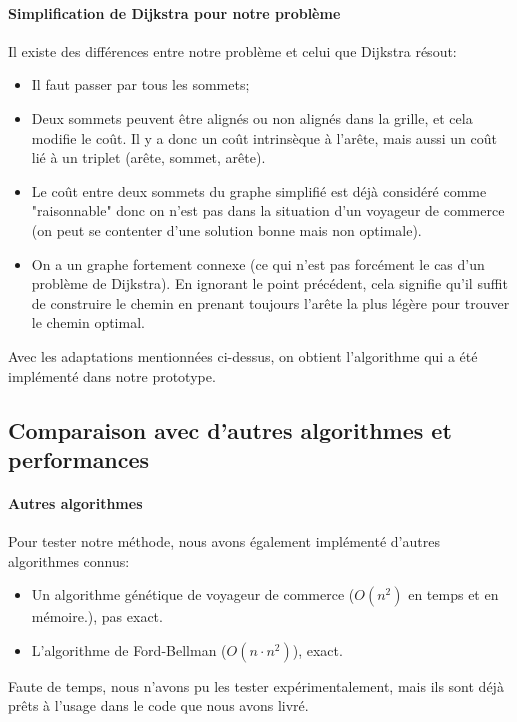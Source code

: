 \paragraph{Simplification de Dijkstra pour notre problème}
Il existe des différences entre notre problème et celui que Dijkstra résout:
\begin{itemize}
	\item Il faut passer par tous les sommets;
	\item Deux sommets peuvent être alignés ou non alignés dans la grille, et cela modifie le coût. Il y a donc un coût intrinsèque à l'arête, mais aussi un coût lié à un triplet (arête, sommet, arête).
	\item Le coût entre deux sommets du graphe simplifié est déjà considéré comme "raisonnable" donc on n'est pas dans la situation d'un voyageur de commerce (on peut se contenter d'une solution bonne mais non optimale). \cite{wiki:voyageurCommerce}
	\item On a un graphe fortement connexe (ce qui n'est pas forcément le cas d'un problème de Dijkstra). En ignorant le point précédent, cela signifie qu'il suffit de construire le chemin en prenant toujours l'arête la plus légère pour trouver le chemin optimal.
\end{itemize}
Avec les adaptations mentionnées ci-dessus, on obtient l'algorithme qui a été implémenté dans notre prototype.
\subsection{Comparaison avec d'autres algorithmes et performances}
\paragraph{Autres algorithmes}
Pour tester notre méthode, nous avons également implémenté d'autres algorithmes connus:
\begin{itemize}
	\item Un algorithme génétique de voyageur de commerce ($O(n^2)$ en temps et en mémoire.), pas exact.
	\item L'algorithme de Ford-Bellman ($O(n \cdot n^2)$), exact.
\end{itemize}
Faute de temps, nous n'avons pu les tester expérimentalement, mais ils sont déjà prêts à l'usage dans le code que nous avons livré.
